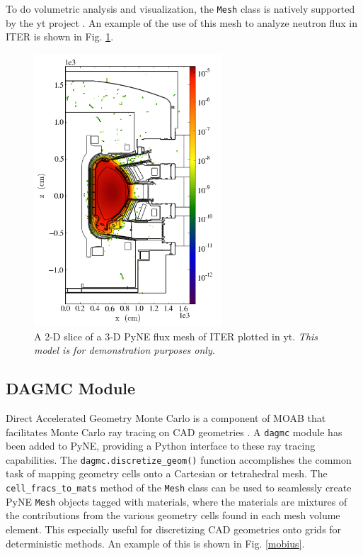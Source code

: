 \documentclass{anstrans}
\newcommand{\Mesh}{\texttt{Mesh} }
\begin{document}
To do volumetric analysis and visualization, the \Mesh class is natively supported 
by the yt project \cite{2011ApJS..192....9T}. An example of the use of this mesh
to analyze neutron flux in ITER is shown in Fig. \ref{ITER}.

\begin{figure}
    \centering
    \includegraphics[width=7.0cm, angle =0]{flux_slice.png}
    \caption{A 2-D slice of a 3-D PyNE flux mesh of ITER plotted in yt. \textit{This model is for demonstration
           purposes only.}}
    \label{ITER}
\end{figure}


\subsection{DAGMC Module}

Direct Accelerated Geometry Monte Carlo is a component of MOAB that
facilitates Monte Carlo ray tracing on CAD geometries
\cite{tautges_acceleration_2009}.  A \texttt{dagmc} module has been added to
PyNE, providing a Python interface to these ray tracing capabilities. The
\texttt{dagmc.discretize\_geom()} function accomplishes the common task of
mapping geometry cells onto a Cartesian or tetrahedral mesh. The
\texttt{cell\_fracs\_to\_mats} method of the \texttt{Mesh} class can be used
to seamlessly create PyNE \texttt{Mesh} objects tagged with materials, where
the materials are mixtures of the contributions from the various geometry cells
found in each mesh volume element. This especially useful for discretizing CAD
geometries onto grids for deterministic methods. An example of this is shown in
Fig. \ref{mobius}.
\end{document}
